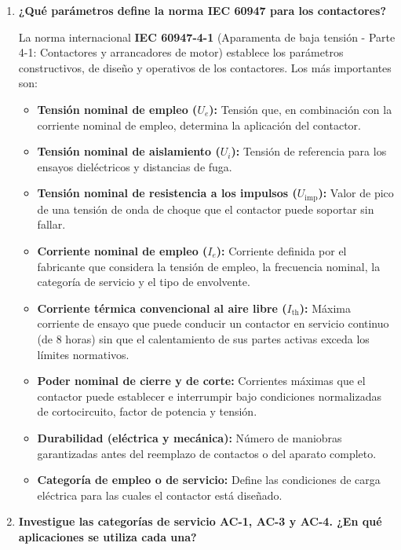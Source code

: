\begin{enumerate}
    \item \textbf{¿Qué parámetros define la norma IEC 60947 para los contactores?}

    La norma internacional \textbf{IEC 60947-4-1} (Aparamenta de baja tensión - Parte 4-1: Contactores y arrancadores de motor) establece los parámetros constructivos, de diseño y operativos de los contactores. Los más importantes son:
    \begin{itemize}
        \item \textbf{Tensión nominal de empleo ($U_e$):} Tensión que, en combinación con la corriente nominal de empleo, determina la aplicación del contactor.
        \item \textbf{Tensión nominal de aislamiento ($U_i$):} Tensión de referencia para los ensayos dieléctricos y distancias de fuga.
        \item \textbf{Tensión nominal de resistencia a los impulsos ($U_{\text{imp}}$):} Valor de pico de una tensión de onda de choque que el contactor puede soportar sin fallar.
        \item \textbf{Corriente nominal de empleo ($I_e$):} Corriente definida por el fabricante que considera la tensión de empleo, la frecuencia nominal, la categoría de servicio y el tipo de envolvente.
        \item \textbf{Corriente térmica convencional al aire libre ($I_{\text{th}}$):} Máxima corriente de ensayo que puede conducir un contactor en servicio continuo (de 8 horas) sin que el calentamiento de sus partes activas exceda los límites normativos.
        \item \textbf{Poder nominal de cierre y de corte:} Corrientes máximas que el contactor puede establecer e interrumpir bajo condiciones normalizadas de cortocircuito, factor de potencia y tensión.
        \item \textbf{Durabilidad (eléctrica y mecánica):} Número de maniobras garantizadas antes del reemplazo de contactos o del aparato completo.
        \item \textbf{Categoría de empleo o de servicio:} Define las condiciones de carga eléctrica para las cuales el contactor está diseñado.
    \end{itemize}

    \item \textbf{Investigue las categorías de servicio AC-1, AC-3 y AC-4. ¿En qué aplicaciones se utiliza cada una?}


\end{enumerate}
